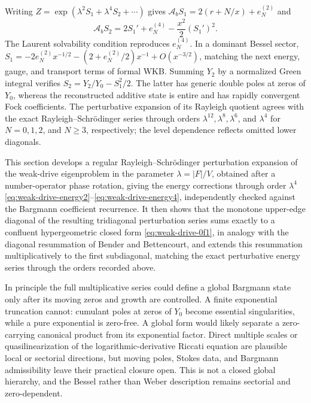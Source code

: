 \documentclass[11pt]{article}
\theoremstyle{remark}
\begin{document}
Writing $Z=\exp(\lambda^2S_1+\lambda^4S_2+\cdots)$ gives
$\mathcal A_bS_1=2(r+N/x)+e_N^{(2)}$ and
\begin{equation}
 \mathcal A_bS_2=2S_1'+e_N^{(4)}-\frac{x^2}{2}(S_1')^2.
 \label{eq:weak-drive-second-dressing}
\end{equation}
The Laurent solvability condition reproduces $e_N^{(4)}$.  In a dominant
Bessel sector,
$S_1=-2e_N^{(2)}x^{-1/2}-(2+e_N^{(2)}/2)x^{-1}+O(x^{-3/2})$,
matching the next energy, gauge, and transport terms of formal WKB.
Summing $Y_2$ by a normalized Green integral verifies
$S_2=Y_2/Y_0-S_1^2/2$.  The latter has generic double poles at
zeros of $Y_0$, whereas the reconstructed additive state is entire and
has rapidly convergent Fock coefficients.  The perturbative expansion of
its Rayleigh quotient agrees with the exact Rayleigh--Schr\"odinger series
through orders $\lambda^{12},\lambda^8,\lambda^6$, and $\lambda^4$ for
$N=0,1,2$, and $N\ge3$, respectively; the level dependence reflects
omitted lower diagonals.

This section develops a regular Rayleigh--Schr\"odinger perturbation
expansion of the weak-drive eigenproblem in the parameter $\lambda=|F|/V$,
obtained after a number-operator phase rotation, giving the energy
corrections through order $\lambda^4$
\eqref{eq:weak-drive-energy2}--\eqref{eq:weak-drive-energy4}, independently
checked against the Bargmann coefficient recurrence.  It then shows that
the monotone upper-edge diagonal of the resulting tridiagonal perturbation
series sums exactly to a confluent hypergeometric closed form
\eqref{eq:weak-drive-0f1}, in analogy with the diagonal resummation of
Bender and Bettencourt, and extends this resummation multiplicatively to
the first subdiagonal, matching the exact perturbative energy series
through the orders recorded above.

In principle the full multiplicative series could define a global Bargmann
state only after its moving zeros and growth are controlled.  A finite
exponential truncation cannot: cumulant poles at zeros of $Y_0$ become
essential singularities, while a pure exponential is zero-free.  A global
form would likely separate a zero-carrying canonical product from its
exponential factor.  Direct multiple scales or quasilinearization of the
logarithmic-derivative Riccati equation are plausible local or sectorial
directions, but moving poles, Stokes data, and Bargmann admissibility leave
their practical closure open.  This is not a closed global hierarchy, and
the Bessel rather than Weber description remains sectorial and zero-dependent.
\end{document}

